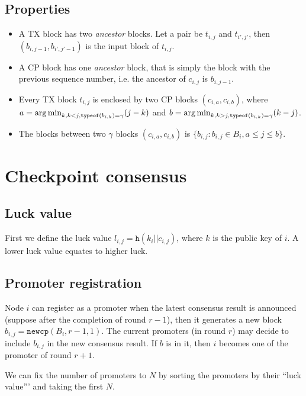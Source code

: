 \subsection{Properties}
\begin{itemize}
\item A TX block has two \emph{ancestor} blocks. Let a pair be $t_{i,j}$ and
  $t_{i',j'}$, then $(b_{i, j-1}, b_{i', j'-1})$ is the input block of $t_{i,j}$.

\item A CP block has one \emph{ancestor} block, that is simply the block with
  the previous sequence number, i.e. the ancestor of $c_{i,j}$ is $b_{i,j-1}$.

\item Every TX block $t_{i,j}$ is enclosed by two CP blocks $(c_{i,a},
  c_{i,b})$, where $a = \operatorname*{arg\,min}_{k, k < j, \texttt{typeof}(b_{i,k}) = \gamma}(j
  - k)$ and $b = \operatorname*{arg\,min}_{k, k > j, \texttt{typeof}(b_{i,k}) = \gamma}(k - j)$.

\item The blocks between two $\gamma$ blocks $(c_{i,a}, c_{i,b})$ is $\{b_{i,j}
  : b_{i,j} \in B_i, a \le j \le b\}$.

\end{itemize}

\section{Checkpoint consensus}

\subsection{Luck value}
First we define the luck value $l_{i,j} = \texttt{h}(k_i || c_{i,j})$, where $k$ is the
public key of $i$. A lower luck value equates to higher luck.

\subsection{Promoter registration}
Node $i$ can register as a promoter when the latest consensus result is
announced (suppose after the completion of round $r-1$), then it generates a new
block $b_{i,j} = \texttt{newcp}(B_i, r-1, 1)$. The current promoters (in round
$r$) may decide to include $b_{i,j}$ in the new consensus result. If $b$ is in
it, then $i$ becomes one of the promoter of round $r+1$.

We can fix the number of promoters to $N$ by sorting the promoters by their
``luck value''' and taking the first $N$. 

